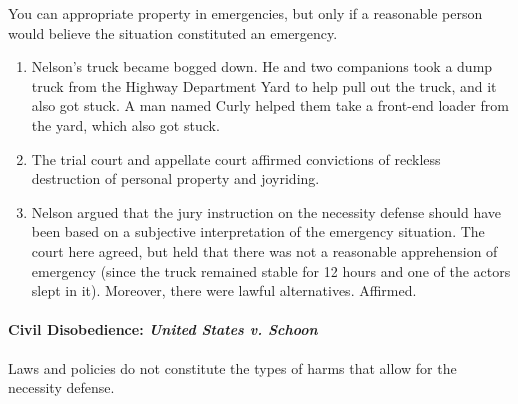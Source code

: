 You can appropriate property in emergencies, but only if a reasonable person 
would believe the situation constituted an emergency.

\begin{enumerate}
    \item Nelson's truck became bogged down. He and two companions took a dump 
    truck from the Highway Department Yard to help pull out the truck, and it 
    also got stuck. A man named Curly helped them take a front-end loader from 
    the yard, which also got stuck.
    \item The trial court and appellate court affirmed convictions of reckless 
    destruction of personal property and joyriding.
    \item Nelson argued that the jury instruction on the necessity defense 
    should have been based on a subjective interpretation of the emergency 
    situation. The court here agreed, but held that there was not a reasonable 
    apprehension of emergency (since the truck remained stable for 12 hours 
    and one of the actors slept in it). Moreover, there were lawful 
    alternatives. Affirmed.
\end{enumerate}

\paragraph{Civil Disobedience: \emph{United States v. Schoon}}

Laws and policies do not constitute the types of harms that allow for the 
necessity defense.


